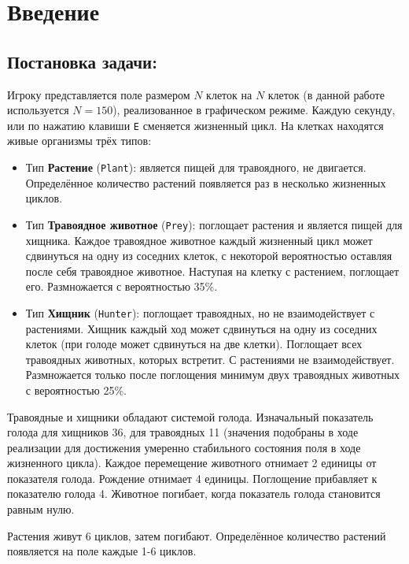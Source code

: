 \documentclass[fleqn]{article}
\begin{document}
\tableofcontents

\newpage

\section{Введение}

\subsection{Постановка задачи:}

Игроку представляется поле размером $N$ клеток на $N$ клеток (в данной работе используется $N=150$), реализованное в графическом режиме.
Каждую секунду, или по нажатию клавиши \verb|E| сменяется жизненный цикл.
На клетках находятся живые организмы трёх типов:
\begin{itemize}
	\item Тип \textbf{Растение} (\verb+Plant+): является пищей для травоядного, не двигается. Определённое количество растений появляется раз в несколько жизненных циклов.

	\item Тип \textbf{Травоядное животное} (\verb|Prey|): поглощает растения и является пищей для хищника. Каждое травоядное животное каждый жизненный цикл может сдвинуться на одну из соседних клеток, с некоторой вероятностью оставляя после себя травоядное животное. Наступая на клетку с растением, поглощает его. Размножается с вероятностью 35\%.

	\item Тип {\bf Хищник} (\verb"Hunter"): поглощает травоядных, но не взаимодействует с растениями. Хищник каждый ход может сдвинуться на одну из соседних клеток (при голоде может сдвинуться на две клетки). Поглощает всех  травоядных животных, которых встретит. С растениями не взаимодействует. Размножается только после поглощения минимум двух травоядных животных с вероятностью 25\%.
\end{itemize}

Травоядные и хищники обладают системой голода. Изначальный показатель голода для хищников 36, для травоядных 11 (значения подобраны в ходе реализации для достижения умеренно стабильного состояния поля в ходе жизненного цикла).
Каждое перемещение животного отнимает 2 единицы от показателя голода.
Рождение отнимает 4 единицы.
Поглощение прибавляет к показателю голода 4.
Животное погибает, когда показатель голода становится равным нулю.

Растения живут 6 циклов, затем погибают.
Определённое количество растений появляется на поле каждые 1-6 циклов.
\end{document}
